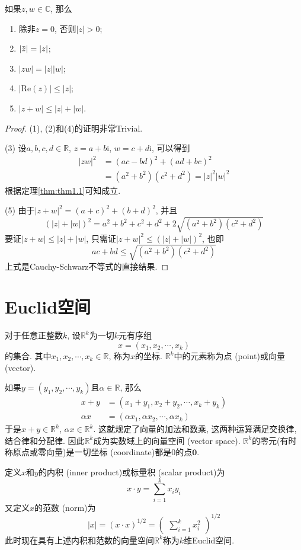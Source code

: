 \documentclass[cn,12pt,math=mtpro2,citestyle=gb7714-2015,bibstyle=gb7714-2015,twocol]{elegantbook}
\newcommand{\R}{\mathbb{R}}
\newcommand{\C}{\mathbb{C}}
\newcommand{\bx}{x}
\newcommand{\overbar}[1]{\mkern 1.5mu\overline{\mkern-1.5mu#1\mkern-1.5mu}\mkern 1.5mu}
\begin{document}
\begin{theorem}
  如果$z, w \in\C$, 那么
\begin{enumerate}[label=(\arabic*)]
  \item 除非$z=0$, 否则$|z|>0$;
  \item $|\overbar{z}|=|z|$;
  \item $|zw|=|z||w|$;
  \item $|\text{Re}(z)|\leq |z|$;
  \item $|z+w|\leq |z|+|w|$.
\end{enumerate}
\end{theorem}
\begin{proof}
  (1), (2)和(4)的证明非常Trivial.

  (3) 设$a,b,c,d\in\R$, $z=a+b\text{i}$, $w=c+d\text{i}$, 可以得到
  \begin{align*}
  |zw|^2&=(ac-bd)^2+(ad+bc)^2\\
  &=(a^2+b^2)(c^2+d^2)=|z|^2|w|^2
  \end{align*}
  根据定理\ref{thm:thm1.1}可知成立.

  (5) 由于$|z+w|^2=(a+c)^2+(b+d)^2$, 并且
  $$(|z|+|w|)^2=a^2+b^2+c^2+d^2+2\sqrt{(a^2+b^2)(c^2+d^2)}$$
  要证$|z+w|\leq |z|+|w|$, 只需证$|z+w|^2\leq (|z|+|w|)^2$, 也即
  $$ac+bd\leq\sqrt{(a^2+b^2)(c^2+d^2)}$$
  上式是Cauchy-Schwarz不等式的直接结果.
\end{proof}


\section{Euclid空间}
\begin{definition}
对于任意正整数$k$, 设$\R^k$为一切$k$元有序组
$$x=(x_1,x_2,\cdots,x_k)$$
的集合. 其中$x_1,x_2,\cdots,x_k\in\R$, 称为$x$的坐标. $\R^k$中的元素称为点 (point)或向量 (vector).
\end{definition}

如果$y=(y_1,y_2,\cdots,y_k)$且$\alpha\in\R$, 那么
\begin{align*}
x+y &=(x_1+y_1,x_2+y_2,\cdots,x_k+y_k) \\
\alpha x&=(\alpha x_1,\alpha x_2,\cdots,\alpha x_k)
\end{align*}
于是$x+y \in\R^k$, $\alpha x\in\R^k$. 这就规定了向量的加法和数乘, 这两种运算满足交换律, 结合律和分配律. 因此$\R^k$成为实数域上的向量空间 (vector space). $\R^k$的零元(有时称原点或零向量)是一切坐标 (coordinate)都是0的点$\mathbold{0}$.

定义$x$和$y $的内积 (inner product)或标量积 (scalar product)为
$$x \cdot y =\sum_{i=1}^{k}x_iy_i$$
又定义$\bx$的范数 (norm)为
$$|x|=(x\cdot x)^{1/2}=\begin{pmatrix}
\displaystyle\sum_{i=1}^{k}x_i^2
\end{pmatrix}^{1/2}$$
此时现在具有上述内积和范数的向量空间$\R^k$称为$k$维Euclid空间.
\end{document}
